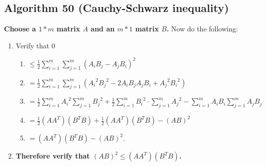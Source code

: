 \documentclass[twocolumn]{article}
\begin{document}
		\subsection{Algorithm 50 (Cauchy-Schwarz inequality)}\label{sec:algorithm 50}
			\textbf{Choose a $1*m$ matrix $A$ and an $m*1$ matrix $B$.} Now do the following:
			\begin{enumerate}
				\item Verify that $0$
				\begin{enumerate}
					\item $\le\frac{1}{2}\sum_{i=1}^m\sum_{j=1}^m (A_iB_j-A_jB_i)^2$
					\item $=\frac{1}{2}\sum_{i=1}^m\sum_{j=1}^m ({A_i}^2{B_j}^2-2A_iB_jA_jB_i+{A_j}^2{B_i}^2)$
					\item $=\frac{1}{2}\sum_{i=1}^m {A_i}^2\sum_{j=1}^m {B_j}^2+\frac{1}{2}\sum_{i=1}^m {B_i}^2\cdot\allowbreak\sum_{j=1}^m {A_j}^2-\sum_{i=1}^m A_iB_i\sum_{j=1}^m A_jB_j$
					\item $=\frac{1}{2}(AA^T)(B^TB)+\frac{1}{2}(AA^T)(B^TB)-(AB)^2$
					\item $=(AA^T)(B^TB)-(AB)^2$.
				\end{enumerate}
				\item \textbf{Therefore verify that $(AB)^2\le(AA^T)(B^TB)$.}
			\end{enumerate}
\end{document}
